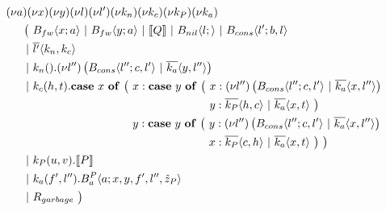 
\begin{align*}
  &\anew{a}{\anew{x}{\anew{y}{\anew{l}{\anew{l'}{\anew{k_n}{\anew{k_c}{\anew{k_P}{\anew{k_a}{ \\
    &\hspace{0.5cm}
    \begin{aligned}[t]
      \big(\ &\ains{B_{fw}}{x}{a}
      \apar   \ains{B_{fw}}{y}{a}
      \apar   \encMJtoAP{Q}
      \apar   \ains{B_{nil}}{l}{}
      \apar   \ains{B_{cons}}{l'}{b, l}
      \\
      \apar  &\asnd{l'}{k_n,k_c}
      \\
      \apar  &\arcv{k_n}{} . \anew{l''}{\parens{\ains{B_{cons}}{l''}{c, l'} \apar \asnd{k_a}{y, l''}}}
      \\
      \apar  &\arcv{k_c}{h,t} .
        \begin{aligned}[t]
          \acse*{x}{\big(\ 
            &\aalt{x}{
              \begin{aligned}[t]
                \acse*{y}{\big(\ 
                  &\aalt{x}{\anew*{l''}{
                    \ains{B_{cons}}{l''}{c,l'} \apar \asnd{k_a}{x,l''}
                  }}\\
                  &\aalt{y}{
                    \asnd{k_P}{h,c} \apar \asnd{k_a}{x,t}
                  }\ 
                \big)}
              \end{aligned}
            }\\
            &\aalt{y}{
              \begin{aligned}[t]
                \acse*{y}{\big(\ 
                  &\aalt{y}{\anew*{l''}{
                    \ains{B_{cons}}{l''}{c,l'} \apar \asnd{k_a}{x,l''}
                  }}\\
                  &\aalt{x}{
                    \asnd{k_P}{c,h} \apar \asnd{k_a}{x,t}
                  }\ 
                \big)}
                \ \big)
              \end{aligned}
            }\ 
          }
        \end{aligned}
      \\
      \apar  &\arcv{k_P}{u,v} . \encMJtoAP{P}
      \\
      \apar  &\arcv{k_a}{f',l''} . \ains{B_a^P}{a}{x, y, f', l'',\tilde{z}_P}
      \\
      \apar  &R_{garbage}
      \ \big)
    \end{aligned}
  }}}}}}}}}
\end{align*}

